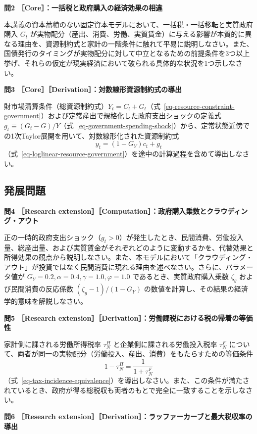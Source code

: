 \documentclass[
  japanese,
  lualatex,
  ja=standard,
  12pt,
  a4paper]{ltjsarticle}
\begin{document}
\textbf{問2 ［Core］：一括税と政府購入の経済効果の相違}

本講義の資本蓄積のない固定資本モデルにおいて、一括税・一括移転と実質政府購入
\(G_t\)
が実物配分（産出、消費、労働、実質賃金）に与える影響が本質的に異なる理由を、資源制約式と家計の一階条件に触れて平易に説明しなさい。また、国債発行のタイミングが実物配分に対して中立となるための前提条件を3つ以上挙げ、それらの仮定が現実経済において破られる具体的な状況を1つ示しなさい。

\Needspace{0.25\textheight}

\textbf{問3 ［Core］［Derivation］：対数線形資源制約式の導出}

財市場清算条件（総資源制約式）\(Y_t = C_t + G_t\)（式~\ref{eq-resource-constraint-government}）および定常産出で規格化した政府支出ショックの定義式
\(g_t \equiv (G_t - G)/Y\)（式~\ref{eq-government-spending-shock}）から、定常状態近傍での1次Taylor展開を用いて、対数線形化された資源制約式
\[
y_t = (1-G_Y) c_t + g_t
\]
（式~\ref{eq-loglinear-resource-government}）を途中の計算過程を含めて導出しなさい。

\subsection{発展問題}\label{ux767aux5c55ux554fux984c}

\textbf{問4 ［Research
extension］［Computation］：政府購入乗数とクラウディング・アウト}

正の一時的政府支出ショック（\(g_t > 0\)）が発生したとき、民間消費、労働投入量、総産出量、および実質賃金がそれぞれどのように変動するかを、代替効果と所得効果の観点から説明しなさい。また、本モデルにおいて「クラウディング・アウト」が投資ではなく民間消費に現れる理由を述べなさい。さらに、パラメータ値が
\(G_Y = 0.2, \alpha = 0.4, \gamma = 1.0, \varphi = 1.0\)
であるとき、実質政府購入乗数 \(\zeta_g\) および民間消費の反応係数
\((\zeta_g - 1)/(1-G_Y)\)
の数値を計算し、その結果の経済学的意味を解説しなさい。

\textbf{問5 ［Research
extension］［Derivation］：労働課税における税の帰着の等価性}

家計側に課される労働所得税率 \(\tau_N^H\) と企業側に課される労働投入税率
\(\tau_N^F\)
について、両者が同一の実物配分（労働投入、産出、消費）をもたらすための等価条件
\[
1 - \tau_N^H = \frac{1}{1+\tau_N^F}
\]
（式~\ref{eq-tax-incidence-equivalence}）を導出しなさい。また、この条件が満たされているとき、政府が得る総税収も両者のもとで完全に一致することを示しなさい。

\textbf{問6 ［Research
extension］［Derivation］：ラッファーカーブと最大税収率の導出}
\end{document}
